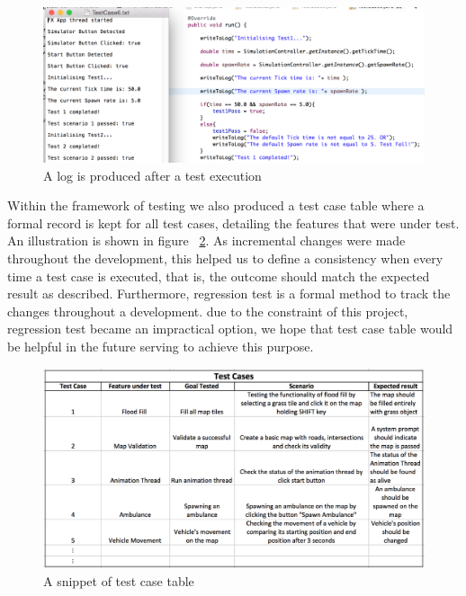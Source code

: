 \begin{figure}[h]
        \begin{center}
                \includegraphics[width=\textwidth]{img/testCase.png}
                \caption{A log is produced after a test execution}
        \label{fig:testCase}
        \end{center}
\end{figure}


Within the framework of testing we also produced a test case table where a formal record is kept for all test cases, detailing the features that were under test. An illustration is shown in figure ~\ref{fig:testCaseTable}.  As incremental changes were made throughout the development, this helped us to define a consistency when every time a test case is executed, that is, the outcome should match the expected result as described.  Furthermore, regression test is a formal method to track the changes throughout a development. due to the constraint of this project, regression test became an impractical option, we hope that test case table would be helpful in the future serving to achieve this purpose.

\begin{figure}[h]
        \begin{center}
                \includegraphics[width=\textwidth]{img/testCaseTable.png}
                \caption{A snippet of test case table}
        \label{fig:testCaseTable}
        \end{center}
\end{figure}

